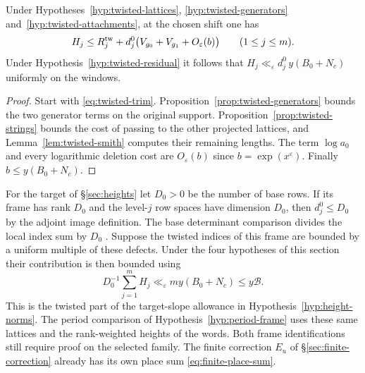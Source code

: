 \begin{theorem}\label{thm:twisted-defect}
Under Hypotheses~\ref{hyp:twisted-lattices},
\ref{hyp:twisted-generators} and~\ref{hyp:twisted-attachments}, at
the chosen shift one has
\[
 H_j\le R_j^{\rm tw}
          +d_j^0\bigl(V_{g_0}+V_{g_1}+O_\varepsilon(b)\bigr)
                       \qquad(1\le j\le m).
\]
Under Hypothesis~\ref{hyp:twisted-residual} it follows that
$H_j\ll_\varepsilon d_j^0\,y(B_0+N_c)$ uniformly on the windows.
\end{theorem}

\begin{proof}
Start with \eqref{eq:twisted-trim}. Proposition~\ref{prop:twisted-generators}
bounds the two generator terms on the original support.
Proposition~\ref{prop:twisted-strings} bounds the cost of passing to
the other projected lattices, and Lemma~\ref{lem:twisted-smith}
computes their remaining lengths. The term $\log a_0$ and every
logarithmic deletion cost are $O_\varepsilon(b)$ since $b=\exp(x^\varepsilon)$.
Finally $b\le y(B_0+N_c)$.
\end{proof}

For the target of \S\ref{sec:heights} let $D_0>0$ be the number of
base rows. If its frame has rank $D_0$ and the level-$j$ row spaces
have dimension $D_0$, then $d_j^0\le D_0$ by the adjoint image
definition. The base determinant comparison divides the local index
sum by $D_0$ \citep[Proposition~15.53]{adriazola-grh}. Suppose the
twisted indices of this frame are bounded by a uniform multiple of
these defects. Under the four hypotheses of this section their
contribution is then bounded using
\[
 D_0^{-1}\sum_{j=1}^m H_j
    \ll_\varepsilon m y(B_0+N_c)\le y\mathcal B .
\]
This is the twisted part of the target-slope allowance in
Hypothesis~\ref{hyp:height-norms}. The period comparison of
Hypothesis~\ref{hyp:period-frame} uses these same lattices and the
rank-weighted heights of the words. Both frame identifications still
require proof on the selected family. The finite correction $E_u$
of \S\ref{sec:finite-correction} already has its own place sum
\eqref{eq:finite-place-sum}.
